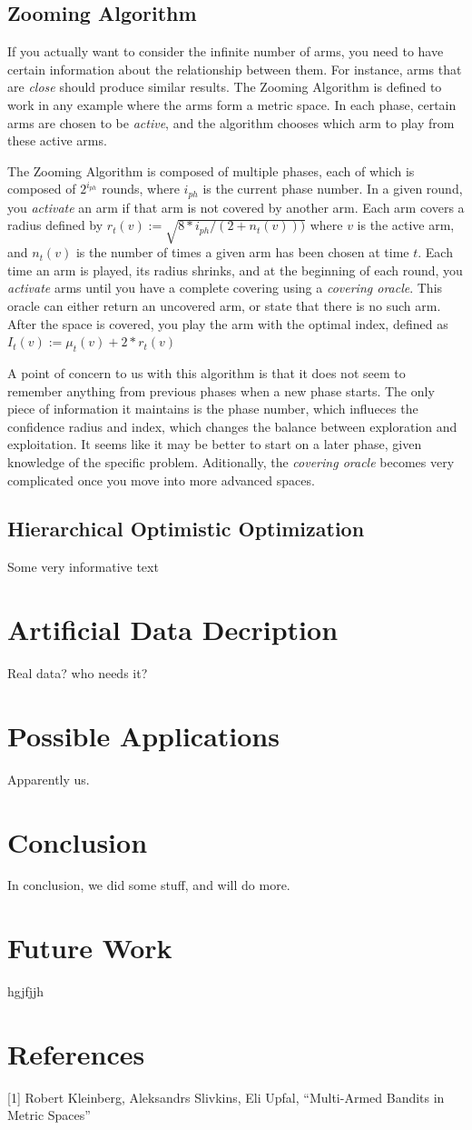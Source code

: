 \documentclass{article}
\begin{document}
\subsection{Zooming Algorithm}
If you actually want to consider the infinite number of arms, you need to have certain information about the relationship between them. For instance, arms that are \emph{close} should produce similar results. The Zooming Algorithm is defined to work in any example where the arms form a metric space. In each phase, certain arms are chosen to be \emph{active}, and the algorithm chooses which arm to play from these active arms.

The Zooming Algorithm is composed of multiple phases, each of which is composed of $2^{i_{ph}}$ rounds, where $i_{ph}$ is the current phase number. In a given round, you \emph{activate} an arm if that arm is not covered by another arm. Each arm covers a radius defined by $r_t(v):=\sqrt{8*i_{ph}/(2+n_t(v)))}$ where $v$ is the active arm, and $n_t(v)$ is the number of times a given arm has been chosen at time $t$. Each time an arm is played, its radius shrinks, and at the beginning of each round, you \emph{activate} arms until you have a complete covering using a \emph{covering oracle}. This oracle can either return an uncovered arm, or state that there is no such arm. After the space is covered, you play the arm with the optimal index, defined as $I_t(v):=\mu_t(v)+2*r_t(v)$

A point of concern to us with this algorithm is that it does not seem to remember anything from previous phases when a new phase starts. The only piece of information it maintains is the phase number, which influeces the confidence radius and index, which changes the balance between exploration and exploitation. It seems like it may be better to start on a later phase, given knowledge of the specific problem. Aditionally, the \emph{covering oracle} becomes very complicated once you move into more advanced spaces.

\subsection{Hierarchical Optimistic Optimization}
Some very informative text

\section{Artificial Data Decription}
Real data? who needs it?
\\
\section{Possible Applications}
Apparently us.
\\
\section{Conclusion}
In conclusion, we did some stuff, and will do more.
\\
\section{Future Work}
hgjfjjh

\section*{References}


[1] Robert Kleinberg, Aleksandrs Slivkins, Eli Upfal, ``Multi-Armed Bandits in Metric Spaces''
\end{document}
